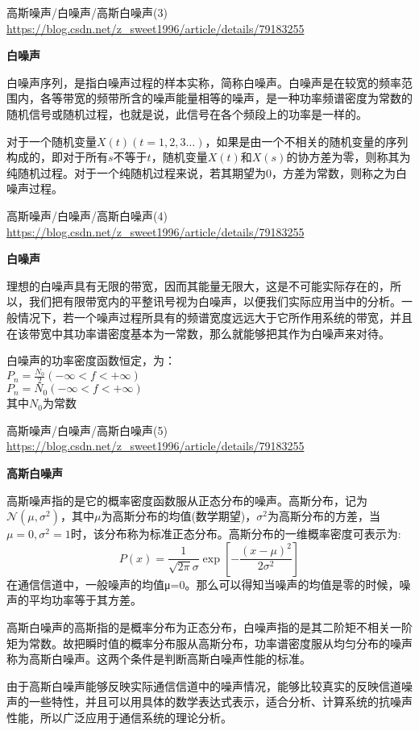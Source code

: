 \begin{frame}{高斯噪声/白噪声/高斯白噪声(3)}
\url{https://blog.csdn.net/z_sweet1996/article/details/79183255}

\textbf{白噪声}

白噪声序列，是指白噪声过程的样本实称，简称白噪声。白噪声是在较宽的频率范围内，各等带宽的频带所含的噪声能量相等的噪声，是一种功率频谱密度为常数的随机信号或随机过程，也就是说，此信号在各个频段上的功率是一样的。

对于一个随机变量$X(t)(t=1,2,3\dots)$，如果是由一个不相关的随机变量的序列构成的，即对于所有$s$不等于$t$，随机变量$X(t)$和$X(s)$的协方差为零，则称其为纯随机过程。对于一个纯随机过程来说，若其期望为0，方差为常数，则称之为白噪声过程。
\end{frame}

\begin{frame}{高斯噪声/白噪声/高斯白噪声(4)}
\url{https://blog.csdn.net/z_sweet1996/article/details/79183255}

\textbf{白噪声}

理想的白噪声具有无限的带宽，因而其能量无限大，这是不可能实际存在的，所以，我们把有限带宽内的平整讯号视为白噪声，以便我们实际应用当中的分析。一般情况下，若一个噪声过程所具有的频谱宽度远远大于它所作用系统的带宽，并且在该带宽中其功率谱密度基本为一常数，那么就能够把其作为白噪声来对待。

白噪声的功率密度函数恒定，为：\\
$P_n=\frac{N_0}{2}(-\infty<f<+\infty)$\\
$P_n=N_0(-\infty<f<+\infty)$\\
其中$N_0$为常数
\end{frame}

\begin{frame}{高斯噪声/白噪声/高斯白噪声(5)}
\url{https://blog.csdn.net/z_sweet1996/article/details/79183255}

\textbf{高斯白噪声}

高斯噪声指的是它的概率密度函数服从正态分布的噪声。高斯分布，记为$\mathcal{N}(\mu,\sigma^2)$，其中$\mu$为高斯分布的均值(数学期望)，$\sigma^2$为高斯分布的方差，当$\mu=0,\sigma^2=1$时，该分布称为标准正态分布。高斯分布的一维概率密度可表示为:
\[P(x)=\frac{1}{\sqrt{2\pi}\sigma}\exp[-\frac{(x-\mu)^2}{2\sigma^2}] \]
在通信信道中，一般噪声的均值μ=0。那么可以得知当噪声的均值是零的时候，噪声的平均功率等于其方差。

高斯白噪声的高斯指的是概率分布为正态分布，白噪声指的是其二阶矩不相关一阶矩为常数。故把瞬时值的概率分布服从高斯分布，功率谱密度服从均匀分布的噪声称为高斯白噪声。这两个条件是判断高斯白噪声性能的标准。

由于高斯白噪声能够反映实际通信信道中的噪声情况，能够比较真实的反映信道噪声的一些特性，并且可以用具体的数学表达式表示，适合分析、计算系统的抗噪声性能，所以广泛应用于通信系统的理论分析。
\end{frame}

